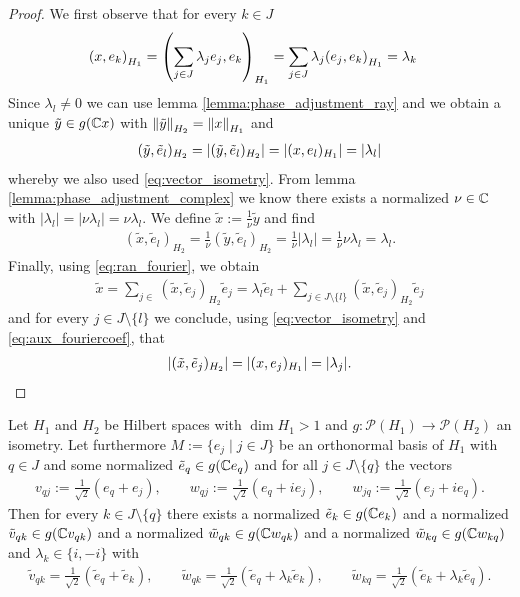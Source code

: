 \begin{proof}
	We first observe that for every $k \in J$ 
	\begin{align}
		\pbraces{x, e_k}_{H_1} &= \pbraces{\sum_{j \in J} \lambda_j e_j, e_k}_{H_1} = \sum_{j \in J} \lambda_j \pbraces{e_j, e_k}_{H_1} = \lambda_k \label{eq:aux_fouriercoef}
	\end{align}
	Since $\lambda_l \neq 0$ we can use lemma \ref{lemma:phase_adjustment_ray} and we obtain a unique $\tilde{y} \in g(\C x)$ with $\norm[H_2]{\tilde{y}} = \norm[H_1]{x}$ and 
	\begin{align*}
		(\tilde{y}, \tilde{e}_l)_{H_2} = |(\tilde{y}, \tilde{e}_l)_{H_2}| = |(x, e_l)_{H_1}| = \vbraces{\lambda_l}
	\end{align*}
	whereby we also used \eqref{eq:vector_isometry}. From lemma \ref{lemma:phase_adjustment_complex} we know there exists a normalized $\nu \in \C$ with $|\lambda_l| = |\nu \lambda_l| = \nu \lambda_l$. We define $\tilde{x} := \frac{1}{\nu} \tilde{y}$ and find
	\begin{align*}
		(\tilde{x}, \tilde{e}_l)_{H_2} = \frac{1}{\nu} (\tilde{y}, \tilde{e}_l)_{H_2} = \frac{1}{\nu} |\lambda_l| = \frac{1}{\nu} \nu \lambda_l = \lambda_l.
	\end{align*} 
	Finally, using \eqref{eq:ran_fourier}, we obtain
	\begin{align*}
		\tilde{x} = \sum_{j \in } (\tilde{x}, \tilde{e}_j)_{H_2} \tilde{e}_j = \lambda_l \tilde{e}_l + \sum_{j \in J \setminus \{l\}} (\tilde{x}, \tilde{e}_j)_{H_2} \tilde{e}_j 
	\end{align*}
	and for every $j \in J \setminus \{l\}$ we conclude, using \eqref{eq:vector_isometry} and \eqref{eq:aux_fouriercoef}, that
	\begin{align*}
		\vbraces{(\tilde{x}, \tilde{e}_j)_{H_2}} = |(x, e_j)_{H_1}| = |\lambda_j|.
	\end{align*}
\end{proof}


\begin{lemma} \label{lemma:function_on_onb}
	Let $H_1$ and $H_2$ be Hilbert spaces with $\dim H_1 > 1$ and $g: \mathcal{P}(H_1) \to \mathcal{P}(H_2)$ an isometry. Let furthermore $M := \{e_j \mid j \in J\}$ be an orthonormal basis of $H_1$ with $q \in J$ and some normalized $\tilde{e}_q \in g(\C e_q)$  and for all $j \in J \setminus \{q\}$ the vectors
	\begin{align*}
		v_{qj} := \frac{1}{\sqrt{2}} (e_q + e_j), \qquad w_{qj} := \frac{1}{\sqrt{2}}(e_q + ie_j), \qquad w_{jq} := \frac{1}{\sqrt{2}}(e_j + ie_q).
	\end{align*} 
	Then for every $k \in J \setminus \{q\}$ there exists a normalized $\tilde{e}_k \in g(\C e_k)$ and a normalized $\tilde{v}_{qk} \in g(\C v_{qk})$ and a normalized $\tilde{w}_{qk} \in g(\C w_{qk})$ and a normalized $\tilde{w}_{kq} \in g(\C w_{kq})$ and $\lambda_k \in \{i, -i\}$ with
	\begin{align*}
		\tilde{v}_{qk} = \frac{1}{\sqrt{2}}(\tilde{e}_{q} + \tilde{e}_k), \qquad \tilde{w}_{qk} = \frac{1}{\sqrt{2}}(\tilde{e}_q + \lambda_k \tilde{e}_k), \qquad \tilde{w}_{kq} = \frac{1}{\sqrt{2}} (\tilde{e}_k + \lambda_k \tilde{e}_q).
	\end{align*}
\end{lemma}


